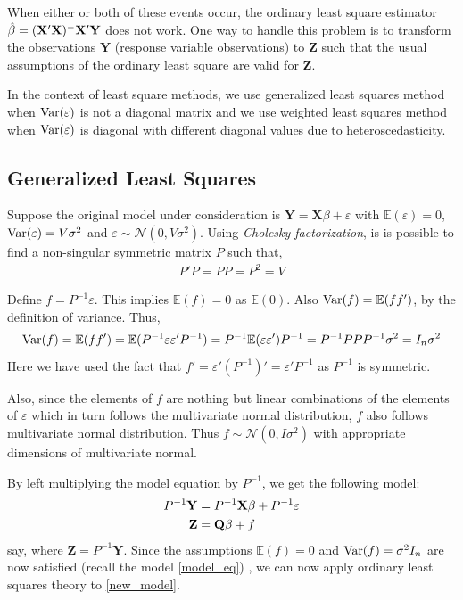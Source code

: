 \documentclass[10pt, a4paper]{article}
\begin{document}
When either or both of these events occur, the ordinary least square estimator \( \hat{\beta} = (\mathbf{X}'\mathbf{X})^{-}\mathbf{X}'\mathbf{Y} \) does not work.
One way to handle this problem is to transform the observations \( \mathbf{Y} \) (response variable observations) to \( \mathbf{Z} \) such that the usual assumptions of the ordinary least square are valid for \( \mathbf{Z} \).

In the context of least square methods, we use generalized least squares method when \( \operatorname{Var}(\varepsilon) \) is not a diagonal matrix and we use weighted least squares method when \( \operatorname{Var}(\varepsilon) \) is diagonal with different diagonal values due to heteroscedasticity.

\subsection{Generalized Least Squares}
Suppose the original model under consideration is \( \mathbf{Y} = \mathbf{X}\beta + \varepsilon \) with \( \mathbb{E}(\varepsilon) = 0 \), \( \operatorname{Var}(\varepsilon) = V\sigma^{2} \) and \( \varepsilon \sim \mathcal{N}(0, V\sigma^{2}) \).
Using \textit{Cholesky factorization}, is is possible to find a non-singular symmetric matrix \( P \) such that, 
\begin{align}
	P'P = PP = P^{2} = V
\end{align}

Define \( f = P^{-1}\varepsilon \). This implies \( \mathbb{E}(f) = 0 \) as \( \mathbb{E}(0) \). Also \( \operatorname{Var}(f) = \mathbb{E}(f f') \), by the definition of variance.
Thus,
\[ \operatorname{Var}(f) = \mathbb{E}(f f') = \mathbb{E}(P^{-1}\varepsilon \varepsilon' P^{-1}) = P^{-1}\mathbb{E}(\varepsilon\varepsilon') P^{-1} = P^{-1}PPP^{-1}\sigma^{2} = I_{n}\sigma^{2} \] 
Here we have used the fact that \( f' = \varepsilon'(P^{-1})'= \varepsilon'P^{-1} \) as \( P^{-1} \) is symmetric.

Also, since the elements of \( f \) are nothing but linear combinations of the elements of \( \varepsilon \) which in turn follows the multivariate normal distribution, \( f \) also follows multivariate normal distribution.
Thus \( f \sim \mathcal{N}(0, I\sigma^{2}) \) with appropriate dimensions of multivariate normal. 

By left multiplying the model equation by \( P^{-1} \), we get the following model:
\begin{align}
	P^{-1}\mathbf{Y} &= P^{-1}\mathbf{X}\beta + P^{-1}\varepsilon \notag \\
	\mathbf{Z} &= \mathbf{Q}\beta + f \label{new_model}
\end{align}
say, where \( \mathbf{Z} = P^{-1}\mathbf{Y} \).
Since the assumptions \( \mathbb{E}(f) = 0 \) and \( \operatorname{Var}(f) = \sigma^{2}I_{n} \) are now satisfied (recall the model \eqref{model_eq}) , we can now apply ordinary least squares theory to \eqref{new_model}.
\end{document}
